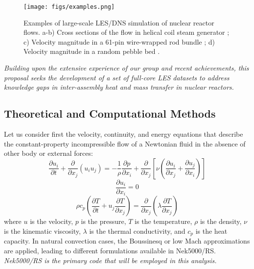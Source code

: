 \begin{figure}[!ht]
\centering
\texttt{[image: figs/examples.png]}
\caption{Examples of large-scale LES/DNS simulation of nuclear reactor flows.
a-b) Cross sections of the flow in helical coil steam generator
\cite{alper2018}; c) Velocity magnitude in a 61-pin wire-wrapped rod bundle
\cite{goth2018comparison}; d) Velocity magnitude in a random pebble bed
\cite{yuan2019}.} \label{f:examples}
\end{figure}


\begin{displayquote}
\textit{
Building upon the extensive experience of our group and recent achievements, this proposal seeks the development of a set of full-core LES
datasets to address knowledge gaps in inter-assembly heat and mass
transfer in nuclear reactors.
}
\end{displayquote}

\vspace{-.25in}
\subsection{Theoretical and Computational Methods}
\vspace{-.2in}

Let us consider first the velocity, continuity, and energy equations that
describe the constant-property incompressible flow of a Newtonian fluid in the
absence of other body or external forces:
\begin{equation}
\frac{\partial  u_i  }{\partial t} +  \frac{\partial}{\partial x_j} \left( u_i u_j \right) =-\frac{1}{\rho} \frac{\partial p}{\partial x_i} + \frac{\partial}{\partial x_j} \left[ \nu \left( \frac{\partial u_i}{\partial x_j} +\frac{\partial u_j}{\partial x_i} \right) \right]
\label{eq:UEqn}
\end{equation}
\begin{equation}
\frac{\partial u_i}{\partial x_i} = 0
\label{eq:rhoEqn}
\end{equation}
\begin{equation}
\rho c_p \left( \frac{\partial T }{\partial t} + u_j \frac{\partial T}{\partial x_j} \right) = \frac{\partial }{\partial x_j} \left( \lambda \frac{\partial T}{\partial x_j} \right)
\label{eq:EEqn}
\end{equation}
where $u$ is the velocity, $p$ is the pressure, $T$ is the temperature, $\rho$
is the  density, $\nu$ is the kinematic viscosity, $\lambda$ is
the thermal conductivity, and $c_p$ is the heat capacity. In natural
convection cases, the Boussinesq or low Mach approximations
\cite{tomboulides1997numerical} are applied, leading to different
formulations available in Nek5000/RS.
{\it Nek5000/RS is the primary code that will be employed
in this analysis.}

